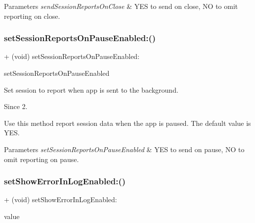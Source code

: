 \begin{DoxyParams}{Parameters}
{\em send\+Session\+Reports\+On\+Close} & Y\+ES to send on close, NO to omit reporting on close. \\
\hline
\end{DoxyParams}
\mbox{\label{interfaceFlurry_a9deea9dd729686c86645ba919fe0776f}} 
\subsubsection{\texorpdfstring{set\+Session\+Reports\+On\+Pause\+Enabled\+:()}{setSessionReportsOnPauseEnabled:()}}
{\footnotesize\ttfamily + (void) set\+Session\+Reports\+On\+Pause\+Enabled\+: \begin{DoxyParamCaption}\item[{(B\+O\+OL)}]{set\+Session\+Reports\+On\+Pause\+Enabled }\end{DoxyParamCaption}}



Set session to report when app is sent to the background. 

\begin{DoxySince}{Since}
2.
\end{DoxySince}
Use this method report session data when the app is paused. The default value is {\ttfamily Y\+ES}.


\begin{DoxyParams}{Parameters}
{\em set\+Session\+Reports\+On\+Pause\+Enabled} & Y\+ES to send on pause, NO to omit reporting on pause. \\
\hline
\end{DoxyParams}
\mbox{\label{interfaceFlurry_a642b4d19fc67250c24dafe66bb40ea71}} 
\subsubsection{\texorpdfstring{set\+Show\+Error\+In\+Log\+Enabled\+:()}{setShowErrorInLogEnabled:()}}
{\footnotesize\ttfamily + (void) set\+Show\+Error\+In\+Log\+Enabled\+: \begin{DoxyParamCaption}\item[{(B\+O\+OL)}]{value }\end{DoxyParamCaption}}



